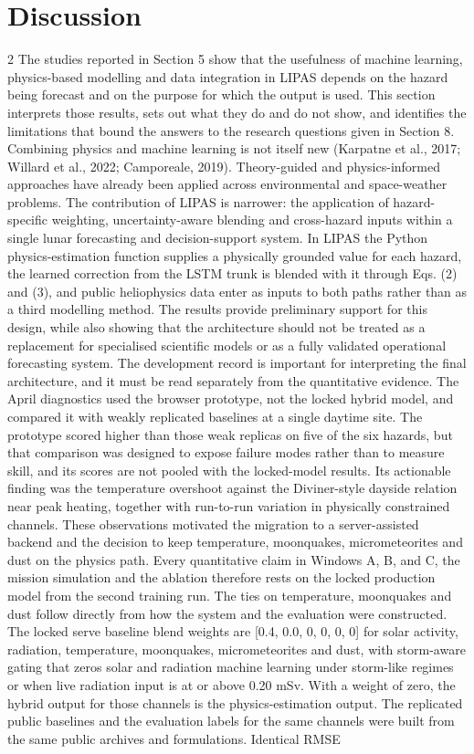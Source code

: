 \section{Discussion}
\begin{multicols}{2}
The studies reported in Section 5 show that the usefulness of machine learning, physics-based modelling and data integration in LIPAS depends on the hazard being forecast and on the purpose for which the output is used. This section interprets those results, sets out what they do and do not show, and identifies the limitations that bound the answers to the research questions given in Section 8. Combining physics and machine learning is not itself new (Karpatne et al., 2017; Willard et al., 2022; Camporeale, 2019). Theory-guided and physics-informed approaches have already been applied across environmental and space-weather problems. The contribution of LIPAS is narrower: the application of hazard-specific weighting, uncertainty-aware blending and cross-hazard inputs within a single lunar forecasting and decision-support system. In LIPAS the Python physics-estimation function supplies a physically grounded value for each hazard, the learned correction from the LSTM trunk is blended with it through Eqs. (2) and (3), and public heliophysics data enter as inputs to both paths rather than as a third modelling method. The results provide preliminary support for this design, while also showing that the architecture should not be treated as a replacement for specialised scientific models or as a fully validated operational forecasting system. The development record is important for interpreting the final architecture, and it must be read separately from the quantitative evidence. The April diagnostics used the browser prototype, not the locked hybrid model, and compared it with weakly replicated baselines at a single daytime site. The prototype scored higher than those weak replicas on five of the six hazards, but that comparison was designed to expose failure modes rather than to measure skill, and its scores are not pooled with the locked-model results. Its actionable finding was the temperature overshoot against the Diviner-style dayside relation near peak heating, together with run-to-run variation in physically constrained channels. These observations motivated the migration to a server-assisted backend and the decision to keep temperature, moonquakes, micrometeorites and dust on the physics path. Every quantitative claim in Windows A, B, and C, the mission simulation and the ablation therefore rests on the locked production model from the second training run. The ties on temperature, moonquakes and dust follow directly from how the system and the evaluation were constructed. The locked serve baseline blend weights are [0.4, 0.0, 0, 0, 0, 0] for solar activity, radiation, temperature, moonquakes, micrometeorites and dust, with storm-aware gating that zeros solar and radiation machine learning under storm-like regimes or when live radiation input is at or above 0.20 mSv. With a weight of zero, the hybrid output for those channels is the physics-estimation output. The replicated public baselines and the evaluation labels for the same channels were built from the same public archives and formulations. Identical RMSE 
\end{multicols}
